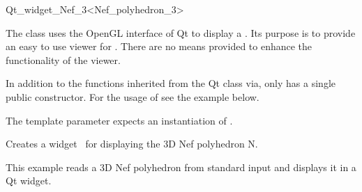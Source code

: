 
\ccRefPageBegin



\begin{ccRefClass}{Qt_widget_Nef_3<Nef_polyhedron_3>}

\ccDefinition
 
The class  uses the OpenGL interface of Qt to display a
. Its purpose is to provide an easy to use viewer for 
. There are no means provided to enhance the 
functionality of the viewer.

In addition to the functions inherited from the Qt class  via,
  only has a single public 
constructor. For the usage of  see the example 
below.


\ccParameters
The template parameter expects an instantiation of .

\ccCreation
{}

{Creates a widget \ccVar\ for displaying the 3D Nef polyhedron N.}

\ccSeeAlso


\ccExample
This example reads a 3D Nef polyhedron from standard input and displays it
in a Qt widget.


\end{ccRefClass}

\ccRefPageEnd
